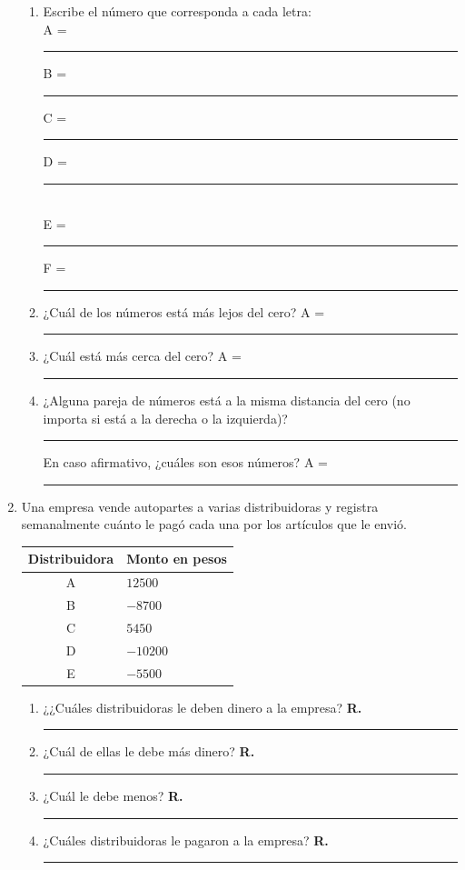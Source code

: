 \begin{enumerate}
\begin{enumerate}[label=\alph*)]
\item Escribe el número que corresponda a cada letra:
\\
A = \rule{1cm}{0.1mm} \hspace{0.2cm} B = \rule{1cm}{0.1mm} \hspace{0.2cm} C = \rule{1cm}{0.1mm} \hspace{0.2cm} D = \rule{1cm}{0.1mm} \hspace{0.2cm} \\ E = \rule{1cm}{0.1mm} \hspace{0.2cm} F = \rule{1cm}{0.1mm} \hspace{0.2cm}
\item ¿Cuál de los números está más lejos del cero? A = \rule{1cm}{0.1mm}
\item ¿Cuál está más cerca del cero? A = \rule{1cm}{0.1mm}
\item ¿Alguna pareja de números está a la misma distancia del cero (no importa si está a la derecha o la izquierda)? \rule{1cm}{0.1mm} \hspace{0.2cm} En caso afirmativo, ¿cuáles son esos números? A = \rule{2cm}{0.1mm} 
\end{enumerate}
\item Una empresa vende autopartes a varias distribuidoras y registra semanalmente cuánto le pagó cada una por los artículos que le envió.
\begin{table}[H]
  \centering
  \large
  \begin{tabular}{| c | l |} \hline
    Distribuidora & Monto en pesos \\ \hline
    A & $12500$ \\ \hline
    B & $-8700$ \\ \hline
    C & $5450$ \\ \hline
    D & $-10200$ \\ \hline
    E & $-5500$ \\ \hline
  \end{tabular}
\end{table}
\begin{enumerate}[label=\alph*)]
\item ¿¿Cuáles distribuidoras le deben dinero a la empresa? \textbf{R.} \rule{2cm}{0.1mm}
\item ¿Cuál de ellas le debe más dinero? \textbf{R.} \rule{2cm}{0.1mm}
\item ¿Cuál le debe menos? \textbf{R.} \rule{2cm}{0.1mm}
\item ¿Cuáles distribuidoras le pagaron a la empresa? \textbf{R.} \rule{2cm}{0.1mm}

\end{enumerate}
\end{enumerate}
